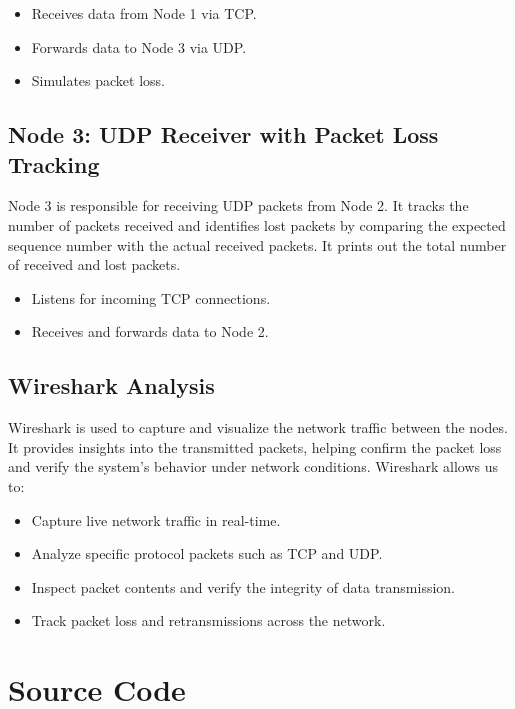 \documentclass{article}
\begin{document}
\begin{itemize}
    \item Receives data from Node 1 via TCP.
    \item Forwards data to Node 3 via UDP.
    \item Simulates packet loss.
\end{itemize}

\subsection{Node 3: UDP Receiver with Packet Loss Tracking}
Node 3 is responsible for receiving UDP packets from Node 2. It tracks the number of packets received and identifies lost packets by comparing the expected sequence number with the actual received packets. It prints out the total number of received and lost packets.
\begin{itemize}
    \item Listens for incoming TCP connections.
    \item Receives and forwards data to Node 2.
\end{itemize}

\subsection{Wireshark Analysis}
Wireshark is used to capture and visualize the network traffic between the nodes. It provides insights into the transmitted packets, helping confirm the packet loss and verify the system’s behavior under network conditions.
Wireshark allows us to:
\begin{itemize}
    \item Capture live network traffic in real-time.
    \item Analyze specific protocol packets such as TCP and UDP.
    \item Inspect packet contents and verify the integrity of data transmission.
    \item Track packet loss and retransmissions across the network.
\end{itemize}





\section{Source Code }
\end{document}
